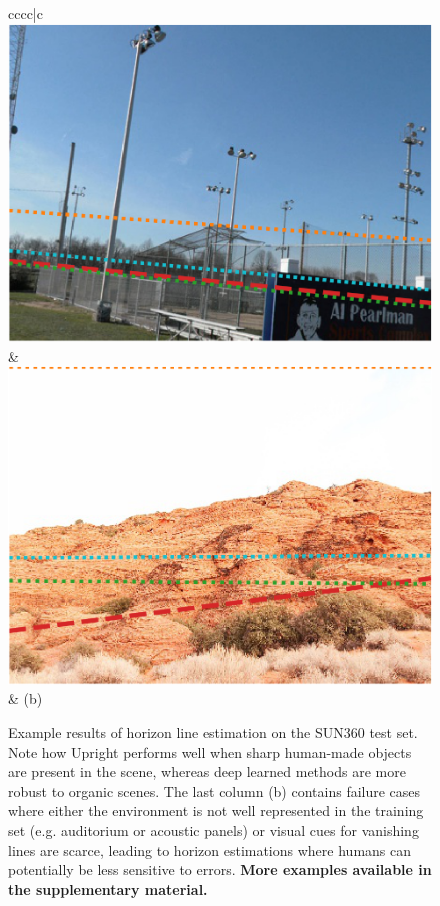 \begin{figure}
\begin{tabular}{cccc|c}
\includegraphics[width=\exampleresultswidth\linewidth]{figures/method/results/pano_ayfwzaseviqbww_jpg-2.png} &
\includegraphics[width=\exampleresultswidth\linewidth]{figures/method/failures/pano_addyndxkhjhutl_jpg-3.png} \\
 & (b) \\
\end{tabular}
\egroup
\caption{Example results of horizon line estimation on the SUN360 test set. Note how Upright performs well when sharp human-made objects are present in the scene, whereas deep learned methods are more robust to organic scenes. The last column (b) contains failure cases where either the environment is not well represented in the training set (e.g. auditorium or acoustic panels) or visual cues for vanishing lines are scarce, leading to horizon estimations where humans can potentially be less sensitive to errors. \textbf{More examples available in the supplementary material.}\vspace{-1em}}
\label{fig:method_example_results}
\end{figure}

